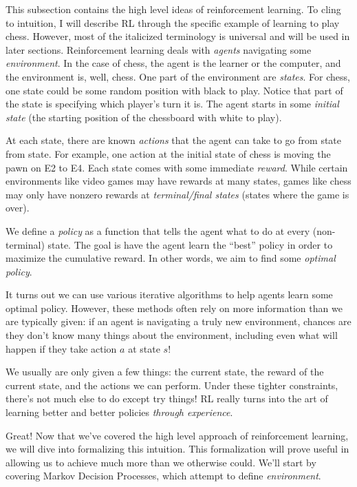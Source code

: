 \documentclass[12pt,oneside,oldfontcommands]{memoir}
\theoremstyle{definition}
\begin{document}
\begin{Subsection}
This subsection contains the high level ideas of reinforcement learning. To cling to intuition, I will describe RL through the specific example of learning to play chess. However, most of the italicized terminology is universal and will be used in later sections. 
\tcblower
Reinforcement learning deals with \textit{agents} navigating some \textit{environment}. In the case of chess, the agent is the learner or the computer, and the environment is, well, chess. One part of the environment are \textit{states}. For chess, one state could be some random position with black to play. Notice that part of the state is specifying which player's turn it is. The agent starts in some \textit{initial state} (the starting position of the chessboard with white to play). 


At each state, there are known \textit{actions} that the agent can take to go from state from state. For example, one action at the initial state of chess is moving the pawn on E2 to E4. Each state comes with some immediate \textit{reward}. While certain environments like video games may have rewards at many states, games like chess may only have nonzero rewards at \textit{terminal/final states} (states where the game is over). 


We define a \textit{policy} as a function that tells the agent what to do at every (non-terminal) state. The goal is have the agent learn the ``best'' policy in order to maximize the cumulative reward. In other words, we aim to find some \textit{optimal policy}.


It turns out we can use various iterative algorithms to help agents learn some optimal policy. However, these methods often rely on more information than we are typically given: if an agent is navigating a truly new environment, chances are they don't know many things about the environment, including even what will happen if they take action $a$ at state $s$!


We usually are only given a few things: the current state, the reward of the current state, and the actions we can perform. Under these tighter constraints, there's not much else to do except try things! RL really turns into the art of learning better and better policies \textit{through experience}.

Great! Now that we've covered the high level approach of reinforcement learning, we will dive into formalizing this intuition. This formalization will prove useful in allowing us to achieve much more than we otherwise could. We'll start by covering Markov Decision Processes, which attempt to define \textit{environment}. 
\end{Subsection}
\end{document}
